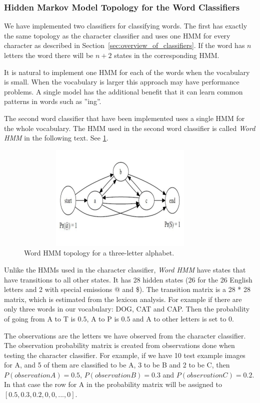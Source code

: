 \subsubsection{Hidden Markov Model Topology for the Word Classifiers}

We have implemented two classifiers for classifying words. 
The first has exactly the same topology as the character classifier and uses one HMM for every character as described in Section~\ref{sec:overview_of_classifiers}. 
If the word has $n$ letters the word there will be $n + 2$ states in the corresponding HMM.

It is natural to implement one HMM for each of the words when the vocabulary is small.
When the vocabulary is larger this approach may have performance problems.
A single model has the additional benefit that it can learn common patterns in words such as ''ing''.

The second word classifier that have been implemented uses a single HMM for the whole vocabulary. 
The HMM used in the second word classifier is called \textit{Word HMM} in the following text.
See \ref{figure:wordtopology}.

\begin{figure}[h!]
\centering
\includegraphics[width=4in,height=2in]{wordtopology}
\caption{Word HMM topology for a three-letter alphabet.}
\label{figure:wordtopology}
\end{figure}

Unlike the HMMs used in the character classifier, \textit{Word HMM} have states that have transitions to all other states.
It has 28 hidden states (26 for the 26 English letters and 2 with special emissions @ and \$). 
The transition matrix is a 28 * 28 matrix, which is estimated from the lexicon analysis.
For example if there are only three words in our vocabulary: DOG, CAT and CAP.
Then the probability of going from A to T is $0.5$, A to P is $0.5$ and A to other letters is set to $0$.

The observations are the letters we have observed from the character classifier.
The observation probability matrix is created from observations done when testing the character classifier.
For example, if we have 10 test example images for A, and 5 of them are classified to be A, 3 to be B and 2 to be C, then $P(observation A)=0.5$, $P(observation B)=0.3$ and $P(observation C)=0.2$.
In that case the row for A in the probability matrix will be assigned to $[0.5, 0.3, 0.2, 0, 0,...,0]$.

